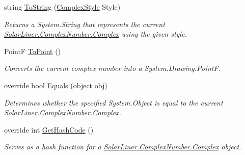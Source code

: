 \begin{DoxyCompactItemize}
string \hyperlink{struct_solar_liner_1_1_complex_number_1_1_complex_ad3f6a21e5fa66904f215fd33199e300c}{To\+String} (\hyperlink{struct_solar_liner_1_1_complex_number_1_1_complex_af40acfb18b45366e7f1e66f752b8dc7d}{Complex\+Style} Style)
\begin{DoxyCompactList}\small\item\em Returns a System.\+String that represents the current \hyperlink{struct_solar_liner_1_1_complex_number_1_1_complex}{Solar\+Liner.\+Complex\+Number.\+Complex} using the given style. \end{DoxyCompactList}\item 
PointF \hyperlink{struct_solar_liner_1_1_complex_number_1_1_complex_aba9e4abced63f3f804858034dff8fe23}{To\+Point} ()
\begin{DoxyCompactList}\small\item\em Converts the current complex number into a System.\+Drawing.\+PointF. \end{DoxyCompactList}\item 
override bool \hyperlink{struct_solar_liner_1_1_complex_number_1_1_complex_a0f67f2bc090ffa2bb7d74fa100d8eb4e}{Equals} (object obj)
\begin{DoxyCompactList}\small\item\em Determines whether the specified System.\+Object is equal to the current \hyperlink{struct_solar_liner_1_1_complex_number_1_1_complex}{Solar\+Liner.\+Complex\+Number.\+Complex}. \end{DoxyCompactList}\item 
override int \hyperlink{struct_solar_liner_1_1_complex_number_1_1_complex_ab1400a8106ca3440f8f083b58d970fcc}{Get\+Hash\+Code} ()
\begin{DoxyCompactList}\small\item\em Serves as a hash function for a \hyperlink{struct_solar_liner_1_1_complex_number_1_1_complex}{Solar\+Liner.\+Complex\+Number.\+Complex} object. \end{DoxyCompactList}\end{DoxyCompactItemize}
